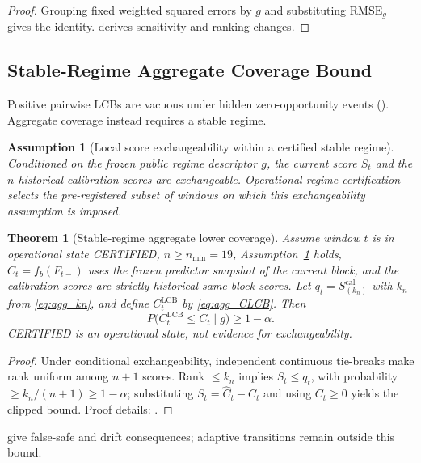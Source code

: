 \documentclass[letterpaper,journal]{IEEEtran}
\newtheorem{theorem}{Theorem}
\newtheorem{assumption}{Assumption}
\begin{document}
\begin{proof}
Grouping fixed weighted squared errors by $g$ and substituting
$\mathrm{RMSE}_g$ gives the identity.  derives
sensitivity and ranking changes.
\end{proof}

\subsection{Stable-Regime Aggregate Coverage Bound}
\label{subsec:agg_coverage_theory}
\label{subsec:pairwise_barrier}

Positive pairwise LCBs are vacuous under hidden zero-opportunity events
(). Aggregate coverage instead requires a stable regime.

\begin{assumption}[Local score exchangeability within a certified stable regime]
\label{ass:score-exchangeability}
Conditioned on the frozen public regime descriptor $g$, the current score
$S_t$ and the $n$ historical calibration scores are exchangeable.  Operational
regime certification selects the pre-registered subset of windows on which
this exchangeability assumption is imposed.
\end{assumption}

\begin{theorem}[Stable-regime aggregate lower coverage]
\label{thm:agg-lcb}
Assume window $t$ is in operational state CERTIFIED, $n\ge n_{\min}=19$,
Assumption~\ref{ass:score-exchangeability} holds, $\widehat C_t=f_b(F_{t-})$
uses the frozen predictor snapshot of the current block, and the calibration
scores are strictly historical same-block scores.  Let
$q_t=S_{(k_n)}^{\mathrm{cal}}$ with $k_n$ from \eqref{eq:agg_kn}, and define
$C^{\mathrm{LCB}}_t$ by \eqref{eq:agg_CLCB}.  Then
\begin{equation}
 P\bigl(C^{\mathrm{LCB}}_t\le C_t\mid g\bigr)\ge 1-\alpha.
 \label{eq:agg_thm1}
\end{equation}
CERTIFIED is an operational state, not evidence for exchangeability.
\end{theorem}

\begin{proof}
Under conditional exchangeability, independent continuous tie-breaks make rank
uniform among $n+1$ scores. Rank $\le k_n$ implies $S_t\le q_t$, with
probability $\ge k_n/(n+1)\ge1-\alpha$; substituting
$S_t=\widehat C_t-C_t$ and using $C_t\ge0$ yields the clipped bound.
Proof details: .
\end{proof}
 give
false-safe and drift consequences; adaptive transitions remain outside this bound.
\end{document}

